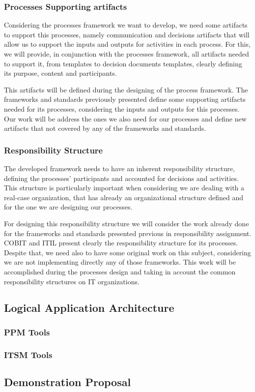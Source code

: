 \subsubsection{Processes Supporting artifacts}

Considering the processes framework we want to develop, we need some artifacts to support this processes, namely communication and decisions artifacts that will allow us to support the inputs and outputs for activities in each process. For this, we will provide, in conjunction with the processes framework, all artifacts needed to support it, from templates to decision documents templates, clearly defining its purpose, content and participants.\par
This artifacts will be defined during the designing of the process framework. The frameworks and standards previously presented define some supporting artifacts needed for its processes, considering the inputs and outputs for this processes. Our work will be address the ones we also need for our processes and define new artifacts that not covered by any of the frameworks and standards.\par

\subsubsection{Responsibility Structure}

The developed framework needs to have an inherent responsibility structure, defining the processes' participants and accounted for decisions and activities. This structure is particularly important when considering we are dealing with a real-case organization, that has already an organizational structure defined and for the one we are designing our processes.\par
For designing this responsibility structure we will consider the work already done for the frameworks and standards presented previous in responsibility assignment. COBIT and ITIL present clearly the responsibility structure for its processes. Despite that, we need also to have some original work on this subject, considering we are not implementing directly any of those frameworks. This work will be accomplished during the processes design and taking in account the common responsibility structures on IT organizations.\par 

\subsection{Logical Application Architecture}

\subsubsection{PPM Tools}

\subsubsection{ITSM Tools}

\subsection{Demonstration Proposal}


